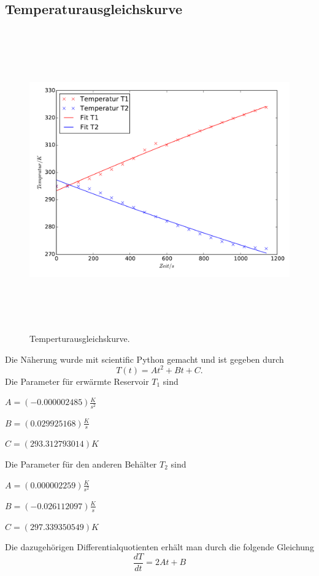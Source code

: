 \subsection{Temperaturausgleichskurve}
\begin{figure}
\includegraphics[height=13cm]{Temperaturgraphik.pdf}
\caption{Temperturausgleichskurve.}
\end{figure}

Die Näherung wurde mit scientific Python gemacht und ist gegeben durch
\begin{equation}
  T(t)=At^2+Bt+C .
\end{equation}
Die Parameter für erwärmte Reservoir $T_1$ sind

  $A=(-0.000002485)\frac{K}{s^2}$

  $B=(0.029925168)\frac{K}{s}$

  $C=(293.312793014)K$

Die Parameter für den anderen Behälter $T_2$ sind

  $A=(0.000002259)\frac{K}{s^2}$

  $B=(-0.026112097)\frac{K}{s}$

  $C=(297.339350549)K$

Die dazugehörigen Differentialquotienten erhält man durch die folgende Gleichung
\begin{equation}
\frac{dT}{dt}=2At+B
\end{equation}

